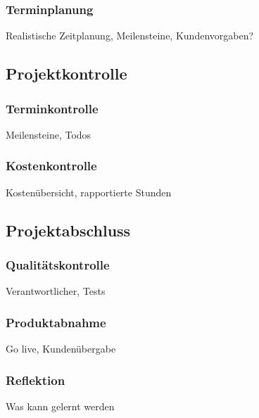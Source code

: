 \subsubsection{Terminplanung}
Realistische Zeitplanung, Meilensteine, Kundenvorgaben?

\subsection{Projektkontrolle}
\subsubsection{Terminkontrolle}
Meilensteine, Todos

\subsubsection{Kostenkontrolle}
Kostenübersicht, rapportierte Stunden

\subsection{Projektabschluss}
\subsubsection{Qualitätskontrolle}
Verantwortlicher, Tests

\subsubsection{Produktabnahme}
Go live, Kundenübergabe

\subsubsection{Reflektion}
Was kann gelernt werden